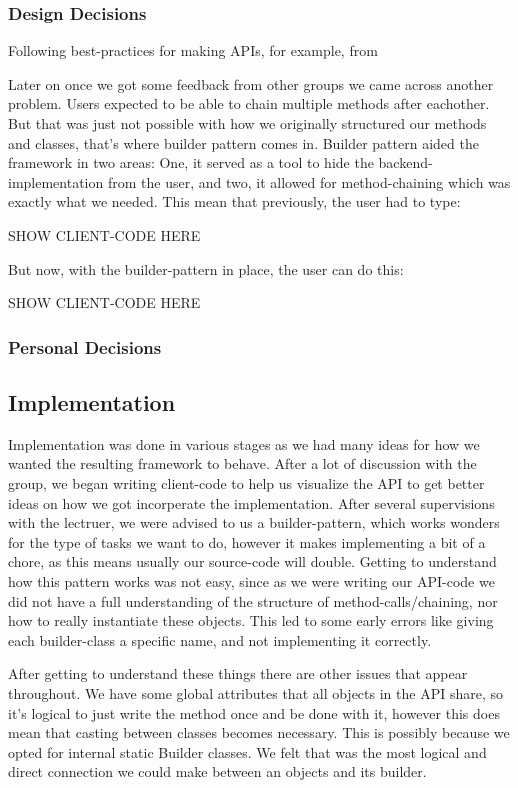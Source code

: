 \documentclass[12pt]{article}
\begin{document}
        \subsubsection{Design Decisions}
        Following best-practices for making APIs, for example, from     

        Later on once we got some feedback from other groups we came across another problem. Users expected to be able to chain multiple methods after eachother. But that was just not possible with how we originally structured our methods and classes, that's where builder pattern comes in. Builder pattern aided the framework in two areas: One, it served as a tool to hide the backend-implementation from the user, and two, it allowed for method-chaining which was exactly what we needed. This mean that previously, the user had to type:

        SHOW CLIENT-CODE HERE

        But now, with the builder-pattern in place, the user can do this:

        SHOW CLIENT-CODE HERE

        \subsubsection{Personal Decisions}



    \subsection{Implementation}
    Implementation was done in various stages as we had many ideas for how we wanted the resulting framework to behave. After a lot of discussion with the group, we began writing client-code to help us visualize the API to get better ideas on how we got incorperate the implementation. After several supervisions with the lectruer, we were advised to us a builder-pattern, which works wonders for the type of tasks we want to do, however it makes implementing a bit of a chore, as this means usually our source-code will double. Getting to understand how this pattern works was not easy, since as we were writing our API-code we did not have a full understanding of the structure of method-calls/chaining, nor how to really instantiate these objects. This led to some early errors like giving each builder-class a specific name, and not implementing it correctly.

    After getting to understand these things there are other issues that appear throughout. We have some global attributes that all objects in the API share, so it's logical to just write the method once and be done with it, however this does mean that casting between classes becomes necessary. This is possibly because we opted for internal static Builder classes. We felt that was the most logical and direct connection we could make between an objects and its builder.
\end{document}
